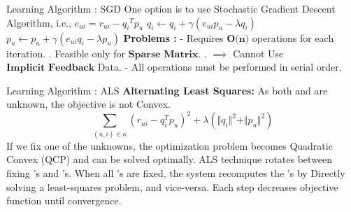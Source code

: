 \documentclass[10pt]{beamer}
\begin{document}
\begin{frame}{Learning Algorithm : SGD}
    One option is to use Stochastic Gradient Descent Algorithm, i.e.,
    $e_{ui} = r_{ui}- {q_i}^T p_u$
    \newline
    $q_i \longleftarrow q_i + \gamma(e_{ui}p_u - \lambda q_i)$
    \newline
    $p_u \longleftarrow p_u + \gamma(e_{ui}q_i - \lambda p_u)$
    \newline \newline
    \textbf{Problems :}
    \newline \newline
    - Requires $\textbf{O(n)}$ operations for each iteration. 
    \newline. \hspace{2mm} Feasible only for $\textbf{Sparse Matrix}$. 
    \newline. \hspace{3mm}$\implies$ Cannot Use $\textbf{Implicit Feedback}$ Data.
    \newline
    - All operations must be performed in serial order. 
\end{frame}

\begin{frame}{Learning Algorithm : ALS}
    \textbf{Alternating Least Squares:}
    \newline \newline
    As both  and  are unknown, the objective is not Convex. 
        \begin{equation}
        \sum\limits_{(u,i)\in \kappa}(r_{ui}-q_{i}^{T} p_{u})^{2}+\lambda(\Vert q_{i}\Vert^{2}+\Vert p_{u}\Vert^{2})
        \end{equation}
    \newline
    If we fix one of the unknowns, the optimization problem becomes Quadratic Convex (QCP) and can be solved optimally.
    \newline \newline
    ALS technique rotates between fixing ’s and ’s. 
    \newline When all ’s are fixed, the system recomputes the ’s by Directly solving a least-squares problem, and vice-versa. 
    \newline Each step decreases objective function until convergence.
\end{frame}
\end{document}
